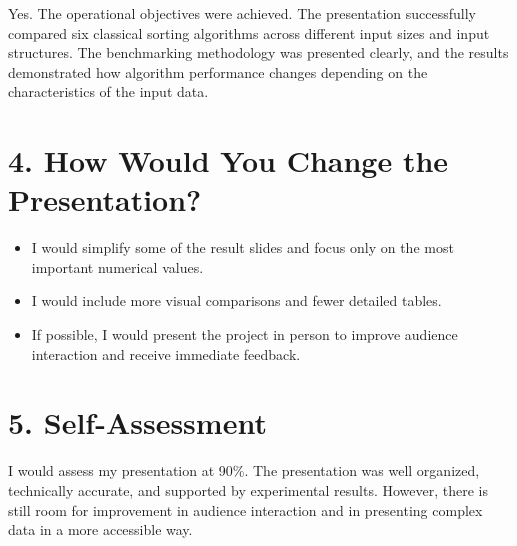\documentclass[12pt]{article}
\begin{document}
Yes. The operational objectives were achieved. The presentation successfully compared six classical sorting algorithms across different input sizes and input structures. The benchmarking methodology was presented clearly, and the results demonstrated how algorithm performance changes depending on the characteristics of the input data.

\section*{4. How Would You Change the Presentation?}

\begin{itemize}
    \item I would simplify some of the result slides and focus only on the most important numerical values.
    \item I would include more visual comparisons and fewer detailed tables.
    \item If possible, I would present the project in person to improve audience interaction and receive immediate feedback.
\end{itemize}

\section*{5. Self-Assessment}

I would assess my presentation at 90\%. The presentation was well organized, technically accurate, and supported by experimental results. However, there is still room for improvement in audience interaction and in presenting complex data in a more accessible way.
\end{document}
